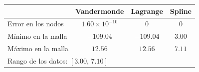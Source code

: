 \begin{tabular}{lccc}
  \toprule
  \rowcolor{Azul1!50}
   & Vandermonde & Lagrange & Spline \\
  \midrule
  Error en los nodos & $1.60\times10^{-10}$ & 0 & 0 \\
  Mínimo en la malla & $-109.04$ & $-109.04$ & $3.00$ \\
  Máximo en la malla & $12.56$ & $12.56$ & $7.11$ \\
  \midrule
  \multicolumn{4}{l}{Rango de los datos: $[3.00,\,7.10]$} \\
  \bottomrule
\end{tabular}
